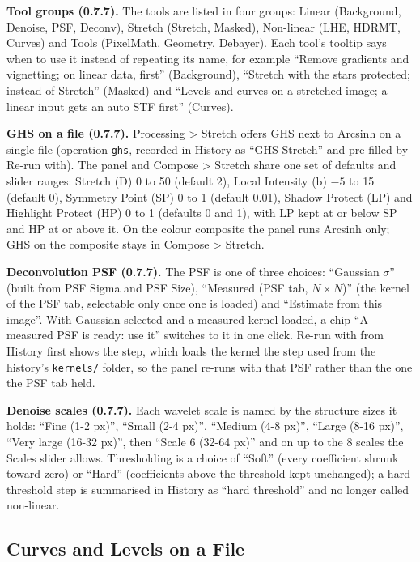 \documentclass[11pt,a4paper]{article}
\newcommand{\code}[1]{\texttt{\small #1}}
\begin{document}
    \textbf{Tool groups (0.7.7).} The tools are listed in four groups: Linear (Background, Denoise, PSF, Deconv), Stretch (Stretch, Masked), Non-linear (LHE, HDRMT, Curves) and Tools (PixelMath, Geometry, Debayer). Each tool's tooltip says when to use it instead of repeating its name, for example ``Remove gradients and vignetting; on linear data, first'' (Background), ``Stretch with the stars protected; instead of Stretch'' (Masked) and ``Levels and curves on a stretched image; a linear input gets an auto STF first'' (Curves).

    \textbf{GHS on a file (0.7.7).} Processing \textgreater{} Stretch offers GHS next to Arcsinh on a single file (operation \code{ghs}, recorded in History as ``GHS Stretch'' and pre-filled by Re-run with). The panel and Compose \textgreater{} Stretch share one set of defaults and slider ranges: Stretch (D) 0 to 50 (default 2), Local Intensity (b) $-5$ to 15 (default 0), Symmetry Point (SP) 0 to 1 (default 0.01), Shadow Protect (LP) and Highlight Protect (HP) 0 to 1 (defaults 0 and 1), with LP kept at or below SP and HP at or above it. On the colour composite the panel runs Arcsinh only; GHS on the composite stays in Compose \textgreater{} Stretch.

    \textbf{Deconvolution PSF (0.7.7).} The PSF is one of three choices: ``Gaussian $\sigma$'' (built from PSF Sigma and PSF Size), ``Measured (PSF tab, $N \times N$)'' (the kernel of the PSF tab, selectable only once one is loaded) and ``Estimate from this image''. With Gaussian selected and a measured kernel loaded, a chip ``A measured PSF is ready: use it'' switches to it in one click. Re-run with from History first shows the step, which loads the kernel the step used from the history's \code{kernels/} folder, so the panel re-runs with that PSF rather than the one the PSF tab held.

    \textbf{Denoise scales (0.7.7).} Each wavelet scale is named by the structure sizes it holds: ``Fine (1-2 px)'', ``Small (2-4 px)'', ``Medium (4-8 px)'', ``Large (8-16 px)'', ``Very large (16-32 px)'', then ``Scale 6 (32-64 px)'' and on up to the 8 scales the Scales slider allows. Thresholding is a choice of ``Soft'' (every coefficient shrunk toward zero) or ``Hard'' (coefficients above the threshold kept unchanged); a hard-threshold step is summarised in History as ``hard threshold'' and no longer called non-linear.

    \subsection{Curves and Levels on a File}
\end{document}
